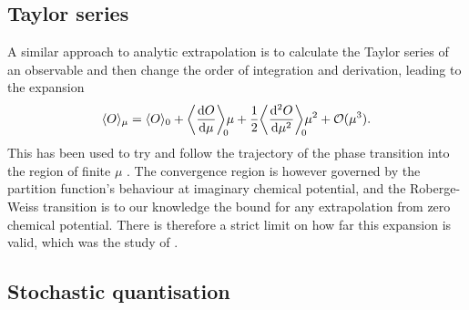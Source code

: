 \subsection{Taylor series}

A similar approach to analytic extrapolation is to calculate the Taylor series
of an observable and then change the order of integration and derivation,
leading to the expansion
%
\begin{equation}
  \langle O \rangle_{\mu} = \langle O \rangle_{0}
   + \bigg\langle \frac{\mathrm{d} O}{\mathrm{d} \mu} \bigg\rangle_{\mathclap{0}} \mu
   + \frac{1}{2} \bigg\langle \frac{\mathrm{d}^2 O}{\mathrm{d} \mu^2} \bigg\rangle_{\mathclap{0}} \mu^2
   + \mathcal{O}(\mu^3).
\end{equation}
%
This has been used to try and follow the trajectory of the phase transition into
the region of finite $\mu$ \citep{Allton:2003vx}. The convergence region is
however governed by the partition function's behaviour at imaginary chemical
potential, and the Roberge-Weiss transition is to our knowledge the bound for
any extrapolation from zero chemical potential. There is therefore a strict
limit on how far this expansion is valid, which was the study of
\citep{Osborn:2008eg}.

\subsection{Stochastic quantisation}

